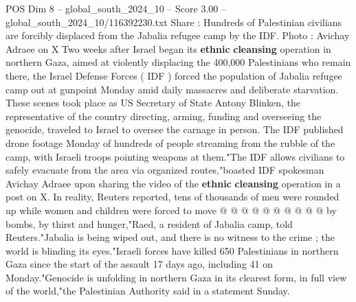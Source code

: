 \begin{textsample}{POS Dim 8 – global\_south\_2024\_10 – Score 3.00 – global\_south\_2024\_10/116392230.txt}  \label{ex:f8_pos_307}
Share : Hundreds of Palestinian civilians are forcibly displaced from the Jabalia refugee camp by the IDF.
Photo : Avichay Adraee on X Two weeks after Israel began its \textbf{ethnic} \textbf{cleansing} operation in northern Gaza, aimed at violently displacing the 400,000 Palestinians who remain there, the Israel Defense Forces ( IDF ) forced the population of Jabalia refugee camp out at gunpoint Monday amid daily massacres and deliberate starvation.
These scenes took place as US Secretary of State Antony Blinken, the representative of the country directing, arming, funding and overseeing the genocide, traveled to Israel to oversee the carnage in person.
The IDF published drone footage Monday of hundreds of people streaming from the rubble of the camp, with Israeli troops pointing weapons at them."The IDF allows civilians to safely evacuate from the area via organized routes,"boasted IDF spokesman Avichay Adraee upon sharing the video of the \textbf{ethnic} \textbf{cleansing} operation in a post on X.
In reality, Reuters reported, tens of thousands of men were rounded up while women and children were forced to move @ @ @ @ @ @ @ @ @ @ by bombs, by thirst and hunger,"Raed, a resident of Jabalia camp, told Reuters."Jabalia is being wiped out, and there is no witness to the crime ; the world is blinding its eyes."Israeli forces have killed 650 Palestinians in northern Gaza since the start of the assault 17 days ago, including 41 on Monday."Genocide is unfolding in northern Gaza in its clearest form, in full view of the world,"the Palestinian Authority said in a statement Sunday.

\end{textsample}
